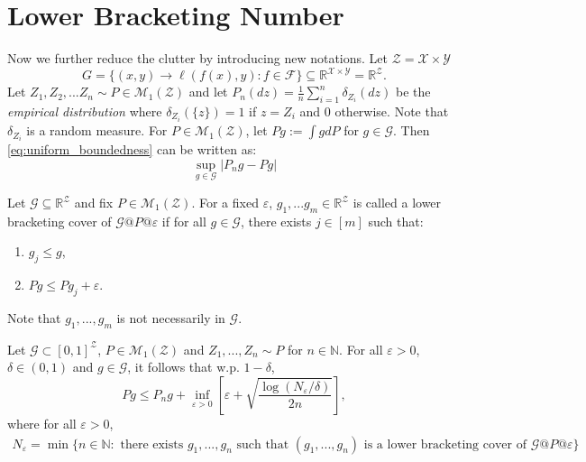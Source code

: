 \documentclass[twoside]{article}
\begin{document}
\section{Lower Bracketing Number}
Now we further reduce the clutter by introducing new notations. Let $\mathcal Z=\mathcal X\times \mathcal Y$
\begin{equation*}
   G = \{(x,y)\to \ell(f(x),y):f\in \mathcal F\}\subseteq \mathbb R^{\mathcal X\times\mathcal Y}=\mathbb R^{\mathcal Z}.
\end{equation*}
Let $Z_1,Z_2,...Z_n\sim P\in \mathcal M_1(\mathcal Z)$ and let $P_n(dz)=\frac{1}{n}\sum_{i=1}^n \delta_{Z_i}(dz)$ be the \textit{empirical distribution} where $\delta_{Z_i}(\{z\})=1$ if $z=Z_i$ and $0$ otherwise. Note that $\delta_{Z_i}$ is a random measure. For $P\in\mathcal M_1(\mathcal Z)$, let $Pg:=\int gdP$ for $g\in \mathcal G$. Then \cref{eq:uniform_boundedness} can be written as:
\begin{equation*}
   \sup_{g\in \mathcal G}\left|P_ng - Pg\right|
\end{equation*}
\begin{definition}\label{defn:lower_bracketing_cover}
   Let $\mathcal G \subseteq \mathbb R^\mathcal Z$ and fix $P\in \mathcal M_1(\mathcal Z)$. For a fixed $\varepsilon$, $g_1,...g_m\in \mathbb R^\mathcal Z$ is called a lower bracketing cover of $\mathcal G\text{@}P\text{@}\varepsilon$ if for all $g\in \mathcal G$, there exists $j\in [m]$ such that:
   \begin{enumerate}
      \item $g_j\le g$,
      \item $Pg\le Pg_j+\varepsilon$.
   \end{enumerate}
   Note that $g_1,...,g_m$ is not necessarily in $\mathcal G$.
\end{definition}
\begin{theorem}
   Let $\mathcal G\subset [0,1]^\mathcal Z$, $P\in \mathcal M_1(\mathcal Z)$ and $Z_1,...,Z_n\sim P$ for $n\in \mathbb N$. For all $\varepsilon>0$, $\delta\in (0,1)$ and $g\in \mathcal G$, it follows that w.p. $1-\delta$,
   \begin{equation*}
      Pg\le P_ng+\inf_{\varepsilon>0}\left[\varepsilon+\sqrt{\frac{\log(N_\varepsilon/\delta)}{2n}}\right],
   \end{equation*}
   where for all $\varepsilon>0$, 
   \begin{align*}
      N_\varepsilon =\min\{n\in \mathbb N: \text{ there exists }g_1,...,g_n \text{ such that }(g_1,...,g_n) \text{ is a lower bracketing cover of }\mathcal G\text{@}P\text{@}\varepsilon\}
   \end{align*}
\end{theorem}
\end{document}
